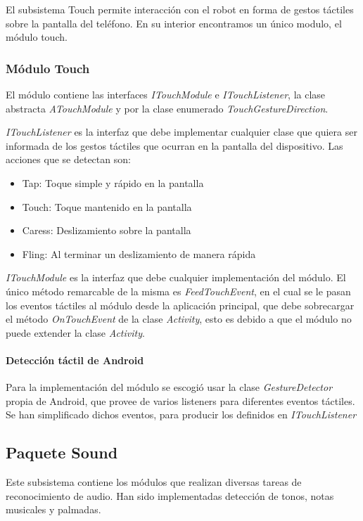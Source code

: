 El subsistema Touch permite interacción con el robot en forma de gestos táctiles sobre la pantalla del teléfono. En su interior encontramos un único modulo, el módulo touch.

\subsubsection{Módulo Touch}
El módulo contiene las interfaces \textit{ITouchModule} e \textit{ITouchListener}, la clase abstracta \textit{ATouchModule} y por la clase enumerado \textit{TouchGestureDirection}.

\textit{ITouchListener} es la interfaz que debe implementar cualquier clase que quiera ser informada de los gestos táctiles que ocurran en la pantalla del dispositivo. Las acciones que se detectan son:

\begin{itemize}
	\item  Tap: Toque simple y rápido en la pantalla
	\item  Touch: Toque mantenido en la pantalla
	\item  Caress: Deslizamiento sobre la pantalla
	\item  Fling: Al terminar un deslizamiento de manera rápida
\end{itemize}


\textit{ITouchModule} es la interfaz que debe cualquier implementación del módulo. El único método remarcable de la misma es \textit{FeedTouchEvent}, en el cual se le pasan los eventos táctiles al módulo desde la aplicación principal, que debe sobrecargar el método \textit{OnTouchEvent} de la clase \textit{Activity}, esto es debido a que el módulo no puede extender la clase \textit{Activity}.

\paragraph*{Detección táctil de Android\\}


Para la implementación del módulo se escogió usar la clase \textit{GestureDetector} propia de Android, que provee de varios listeners para diferentes eventos táctiles.
Se han simplificado dichos eventos, para producir los definidos en \textit{ITouchListener}


\newpage

\subsection{Paquete Sound}
Este subsistema contiene los módulos que realizan diversas tareas de reconocimiento de audio.  Han sido implementadas detección de tonos, notas musicales y palmadas.

